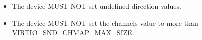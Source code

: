 
\begin{itemize}
\item The device MUST NOT set undefined direction values.
\item The device MUST NOT set the channels value to more than VIRTIO_SND_CHMAP_MAX_SIZE.
\end{itemize}
